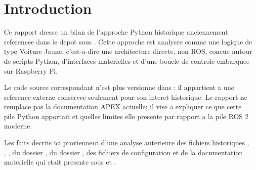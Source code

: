 \section{Introduction}

Ce rapport dresse un bilan de l'approche Python historique anciennement referencee dans le depot sous . Cette approche est analysee comme une logique de type Voiture Jaune, c'est-a-dire une architecture directe, non ROS, concue autour de scripts Python, d'interfaces materielles et d'une boucle de controle embarquee sur Raspberry Pi.

Le code source correspondant n'est plus versionne dans : il appartient a une reference externe conservee seulement pour son interet historique. Le rapport ne remplace pas la documentation APEX actuelle; il vise a expliquer ce que cette pile Python apportait et quelles limites elle presente par rapport a la pile ROS 2 moderne.

Les faits decrits ici proviennent d'une analyse anterieure des fichiers historiques , , , du dossier , du dossier , des fichiers de configuration et de la documentation materielle qui etait presente sous  et .
